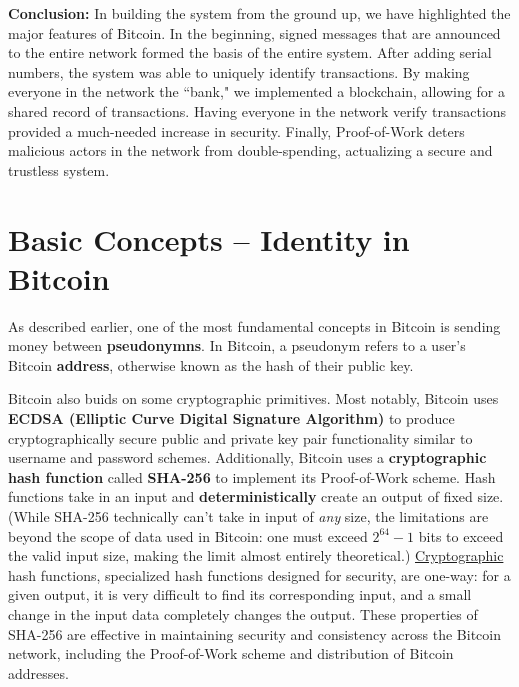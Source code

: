 \documentclass[full.tex]{subfiles}
\begin{document}
    \textbf{Conclusion:} In building the system from the ground up, we have highlighted the major features of Bitcoin. In the beginning, signed messages that are announced to the entire network formed the basis of the entire system. After adding serial numbers, the system was able to uniquely identify transactions. By making everyone in the network the ``bank," we implemented a blockchain, allowing for a shared record of transactions. Having everyone in the network verify transactions provided a much-needed increase in security. Finally, Proof-of-Work deters malicious actors in the network from double-spending, actualizing a secure and trustless system. 
    
    \section*{Basic Concepts -- Identity in Bitcoin}
    
    As described earlier, one of the most fundamental concepts in Bitcoin is sending money between \textbf{pseudonymns}. In Bitcoin, a pseudonym refers to a user's Bitcoin \textbf{address}, otherwise known as the hash of their public key.
    
    Bitcoin also buids on some cryptographic primitives. Most notably, Bitcoin uses \textbf{ECDSA (Elliptic Curve Digital Signature Algorithm)} to produce cryptographically secure public and private key pair functionality similar to username and password schemes. Additionally, Bitcoin uses a \textbf{cryptographic hash function} called \textbf{SHA-256} to implement its Proof-of-Work scheme. Hash functions take in an input and \textbf{deterministically} create an output of fixed size. (While SHA-256 technically can't take in input of \textit{any} size, the limitations are beyond the scope of data used in Bitcoin: one must exceed $2^{64} - 1$ bits to exceed the valid input size, making the limit almost entirely theoretical.) \underline{Cryptographic} hash functions, specialized hash functions designed for security, are one-way: for a given output, it is very difficult to find its corresponding input, and a small change in the input data completely changes the output. These properties of SHA-256 are effective in maintaining security and consistency across the Bitcoin network, including the Proof-of-Work scheme and distribution of Bitcoin addresses.
    
\end{document}
